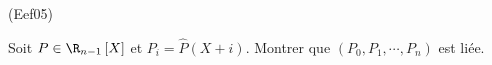 \begin{tiny}(Eef05)\end{tiny}
Soit $P\in \R_{n-1}\left[ X\right] $ et $P_{i}=\widehat{P}(X+i)$. Montrer que $(P_{0},P_{1},\cdots ,P_{n})$ est li{\'e}e.
